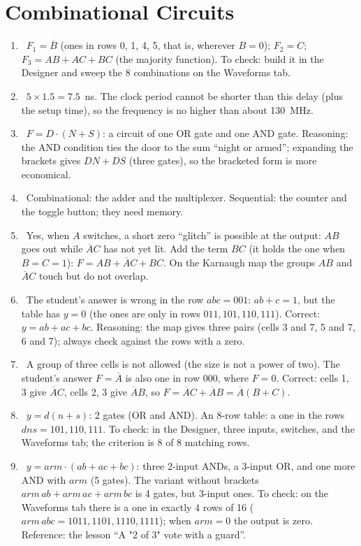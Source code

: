 \section*{Combinational Circuits}
\begin{enumerate}
  \item {}~$F_1=\overline{B}$ (ones in rows 0, 1, 4, 5, that is, wherever $B=0$); $F_2=C$; $F_3=AB+AC+BC$ (the majority function). To check: build it in the Designer and sweep the 8 combinations on the Waveforms tab.
  \item {}~$5\times 1.5=7.5$~ns. The clock period cannot be shorter than this delay (plus the setup time), so the frequency is no higher than about 130~MHz.
  \item {}~$F = D\cdot(N+S)$: a circuit of one OR gate and one AND gate. Reasoning: the AND condition ties the door to the sum ``night or armed''; expanding the brackets gives $DN+DS$ (three gates), so the bracketed form is more economical.
  \item {}~Combinational: the adder and the multiplexer. Sequential: the counter and the toggle button; they need memory.
  \item {}~Yes, when $A$ switches, a short zero ``glitch'' is possible at the output: $AB$ goes out while $\overline{A}C$ has not yet lit. Add the term $BC$ (it holds the one when $B=C=1$): $F = AB + \overline{A}C + BC$. On the Karnaugh map the groups $AB$ and $\overline{A}C$ touch but do not overlap.
  \item {}~The student's answer is wrong in the row $abc=001$: $ab+c=1$, but the table has $y=0$ (the ones are only in rows $011,101,110,111$). Correct: $y=ab+ac+bc$. Reasoning: the map gives three pairs (cells 3 and 7, 5 and 7, 6 and 7); always check against the rows with a zero.
  \item {}~A group of three cells is not allowed (the size is not a power of two). The student's answer $F=\overline{A}$ is also one in row $000$, where $F=0$. Correct: cells 1, 3 give $\overline{A}C$, cells 2, 3 give $\overline{A}B$, so $F=\overline{A}C+\overline{A}B=\overline{A}(B+C)$.
  \item {}~$y=d(n+s)$: 2 gates (OR and AND). An 8-row table: a one in the rows $dn s=101,110,111$. To check: in the Designer, three inputs, switches, and the Waveforms tab; the criterion is 8 of 8 matching rows.
  \item {}~$y=arm\cdot(ab+ac+bc)$: three 2-input ANDs, a 3-input OR, and one more AND with $arm$ (5 gates). The variant without brackets $arm\,ab+arm\,ac+arm\,bc$ is 4 gates, but 3-input ones. To check: on the Waveforms tab there is a one in exactly 4 rows of 16 ($arm\,abc=1011,1101,1110,1111$); when $arm=0$ the output is zero. Reference: the lesson ``A "2 of 3" vote with a guard''.

\end{enumerate}
